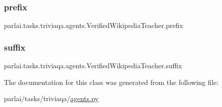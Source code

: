 \subsubsection{\texorpdfstring{prefix}{prefix}}
{\footnotesize\ttfamily parlai.\+tasks.\+triviaqa.\+agents.\+Verified\+Wikipedia\+Teacher.\+prefix}

\mbox{\label{classparlai_1_1tasks_1_1triviaqa_1_1agents_1_1VerifiedWikipediaTeacher_acc499929543ea473b7b298e28e22acab}} 
\subsubsection{\texorpdfstring{suffix}{suffix}}
{\footnotesize\ttfamily parlai.\+tasks.\+triviaqa.\+agents.\+Verified\+Wikipedia\+Teacher.\+suffix}



The documentation for this class was generated from the following file\+:\begin{DoxyCompactItemize}
\item 
parlai/tasks/triviaqa/\hyperlink{parlai_2tasks_2triviaqa_2agents_8py}{agents.\+py}\end{DoxyCompactItemize}
